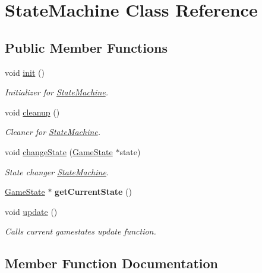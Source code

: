 \hypertarget{class_state_machine}{}\section{State\+Machine Class Reference}
\label{class_state_machine}
\subsection*{Public Member Functions}
\begin{DoxyCompactItemize}
\item 
void \hyperlink{class_state_machine_aa5e0d6f0b06376d0357af0ff85b5b9b2}{init} ()
\begin{DoxyCompactList}\small\item\em Initializer for \hyperlink{class_state_machine}{State\+Machine}. \end{DoxyCompactList}\item 
void \hyperlink{class_state_machine_a64f96b117421c50e208e5c40724230ed}{cleanup} ()
\begin{DoxyCompactList}\small\item\em Cleaner for \hyperlink{class_state_machine}{State\+Machine}. \end{DoxyCompactList}\item 
void \hyperlink{class_state_machine_a408fa50a60a9cff42124df913fbbe69e}{change\+State} (\hyperlink{class_game_state}{Game\+State} $\ast$state)
\begin{DoxyCompactList}\small\item\em State changer \hyperlink{class_state_machine}{State\+Machine}. \end{DoxyCompactList}\item 
\hypertarget{class_state_machine_a129876e0f4cc92f2319ea309244e713a}{}\hyperlink{class_game_state}{Game\+State} $\ast$ {\bfseries get\+Current\+State} ()\label{class_state_machine_a129876e0f4cc92f2319ea309244e713a}

\item 
void \hyperlink{class_state_machine_abc3ca328b644f3d2c557fd04ccd65ddd}{update} ()
\begin{DoxyCompactList}\small\item\em Calls current gamestates update function. \end{DoxyCompactList}\end{DoxyCompactItemize}


\subsection{Member Function Documentation}
\hypertarget{class_state_machine_a408fa50a60a9cff42124df913fbbe69e}{}

